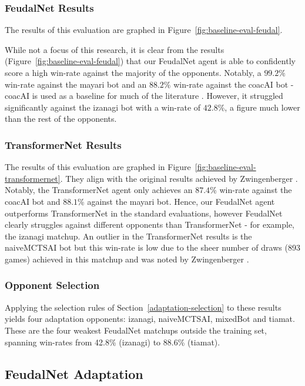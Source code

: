 \documentclass[sigconf,review=false]{acmart}
\begin{document}
\subsubsection{FeudalNet Results}

The results of this evaluation are graphed in Figure~\ref{fig:baseline-eval-feudal}.

While not a focus of this research, it is clear from the results (Figure~\ref{fig:baseline-eval-feudal}) that our FeudalNet agent is able to confidently score a high win-rate against the majority of the opponents.
Notably, a $99.2\%$ win-rate against the mayari bot and an $88.2\%$ win-rate against the coacAI bot - coacAI is used as a baseline for much of the literature \cite{micrortsgridnet, transformernet}.
However, it struggled significantly against the izanagi bot with a win-rate of $42.8\%$, a figure much lower than the rest of the opponents.

\subsubsection{TransformerNet Results}

The results of this evaluation are graphed in Figure~\ref{fig:baseline-eval-transformernet}.
They align with the original results achieved by Zwingenberger \cite{transformernet}.
Notably, the TransformerNet agent only achieves an $87.4$\% win-rate against the coacAI bot and $88.1$\% against the mayari bot.
Hence, our FeudalNet agent outperforms TransformerNet in the standard \cite{micrortsgridnet, transformernet} evaluations, however FeudalNet clearly struggles against different opponents than TransformerNet - for example, the izanagi matchup.
An outlier in the TransformerNet results is the naiveMCTSAI bot but this win-rate is low due to the sheer number of draws (893 games) achieved in this matchup and was noted by Zwingenberger \cite{transformernet}.

\subsubsection{Opponent Selection}
Applying the selection rules of Section~\ref{adaptation-selection} to these results yields four adaptation opponents: izanagi, naiveMCTSAI, mixedBot and tiamat. 
These are the four weakest FeudalNet matchups outside the training set, spanning win-rates from 42.8\% (izanagi) to 88.6\% (tiamat).

\subsection{FeudalNet Adaptation}
\label{feudalnet-adaptation}
\end{document}
